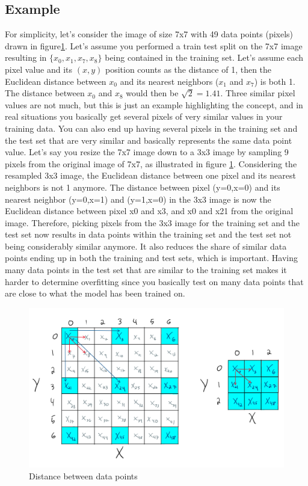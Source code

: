 \documentclass[11pt, a4paper]{article}
\begin{document}
\subsection*{Example}
For simplicity, let’s consider the image of size 7x7 
with 49 data points (pixels) drawn in figure\ref{fig:image_resizing}. Let's assume you performed a train test split on the 7x7 image resulting in $\{x_0,x_1,x_7,x_8\}$ being contained in the 
training set. Let's assume each pixel value and its $(x,y)$ position counts as the distance of 1, then the Euclidean distance between $x_0$ and its nearest neighbors ($x_1$ and $x_7$) is both 1. 
The distance between $x_0$ and $x_8$ would then be $\sqrt{2}=1.41$.
Three similar pixel values are not much, but this is just an example highlighting the concept, and in real situations you basically get several pixels of very similar values in your training data. 
You can also end up having several pixels in the training set and the test set that are very similar and basically represents the same data point value. Let’s say you resize the 7x7 image down to a 
3x3 image by sampling 9 pixels from the original image of 7x7, as illustrated in figure \ref{fig:image_resizing}. Considering the resampled 3x3 image,
the Euclidean distance between one pixel and its nearest neighbors is not 1 anymore. The distance between pixel (y=0,x=0) and its nearest neighbor (y=0,x=1) and (y=1,x=0) 
in the 3x3 image is now the Euclidean distance between pixel x0 and x3, and x0 and x21 from the original image. Therefore, picking pixels from the 3x3 image for the training
set and the test set now results in data points within the training set and the test set not being considerably similar anymore. It also reduces the share of similar data 
points ending up in both the training and test sets, which is important. Having many data points in the test set that are similar to the training set makes it harder to 
determine overfitting since you basically test on many data points that are close to what the model has been trained on.
\begin{figure}
  \centering
  \includegraphics[scale=0.28]{figures/EX6_resizing.png}
  \caption{Distance between data points}
  \label{fig:image_resizing}
\end{figure}
\end{document}
